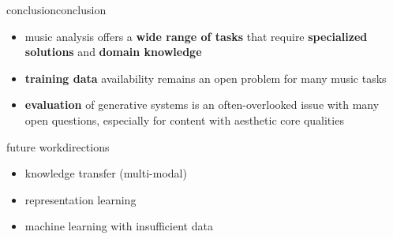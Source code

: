 \begin{frame}{conclusion}{conclusion}

    \begin{itemize}
        \item music analysis offers a \textbf{wide range of tasks} that require \textbf{specialized solutions} and \textbf{domain knowledge}
        \smallskip
        \item \textbf{training data} availability remains an open problem for many music tasks
        \smallskip
        \item \textbf{evaluation} of generative systems is an often-overlooked issue with many open questions, especially for content with aesthetic core qualities
    \end{itemize}
    
\end{frame}

\begin{frame}{future work}{directions}

    \begin{itemize}
        \item knowledge transfer (multi-modal)
        \smallskip
        \item representation learning
        \smallskip
        \item machine learning with insufficient data
    \end{itemize}
    
\end{frame}


